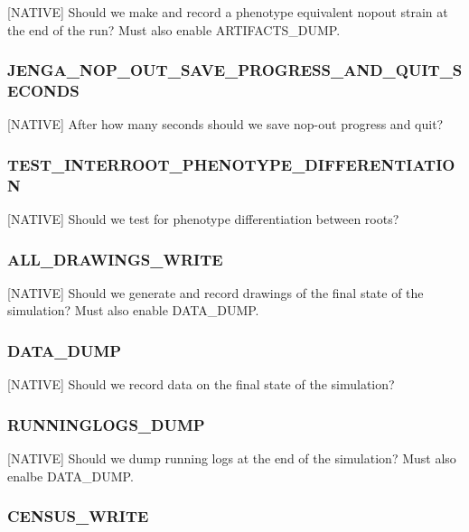 
[NATIVE] Should we make and record a phenotype equivalent nopout strain at the end of the run? Must also enable ARTIFACTS\_DUMP.

\subsubsection{JENGA\_NOP\_OUT\_SAVE\_PROGRESS\_AND\_QUIT\_SECONDS}


[NATIVE] After how many seconds should we save nop-out progress and quit?

\subsubsection{TEST\_INTERROOT\_PHENOTYPE\_DIFFERENTIATION}


[NATIVE] Should we test for phenotype differentiation between roots?

\subsubsection{ALL\_DRAWINGS\_WRITE}


[NATIVE] Should we generate and record drawings of the final state of the simulation? Must also enable DATA\_DUMP.

\subsubsection{DATA\_DUMP}


[NATIVE] Should we record data on the final state of the simulation?

\subsubsection{RUNNINGLOGS\_DUMP}


[NATIVE] Should we dump running logs at the end of the simulation? Must also enalbe DATA\_DUMP.

\subsubsection{CENSUS\_WRITE}

